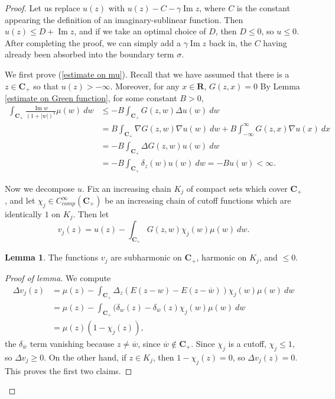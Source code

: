 \documentclass[12pt]{report}
\newcommand{\RR}{\mathbf{R}}
\newcommand{\CC}{\mathbf{C}}
\renewcommand{\Im}{\operatorname{Im}}
\theoremstyle{definition}
\newtheorem{lemma}[theorem]{Lemma}
\begin{document}
\begin{proof}
    Let us replace $u(z)$ with $u(z) - C - \gamma \Im z$, where $C$ is the constant appearing the definition of an imaginary-sublinear function. Then $u(z) \leq D + \Im z$, and if we take an optimal choice of $D$, then $D \leq 0$, so $u \leq 0$. After completing the proof, we can simply add a $\gamma \Im z$ back in, the $C$ having already been absorbed into the boundary term $\sigma$.

    We first prove (\ref{estimate on mu}). Recall that we have assumed that there is a $z \in \CC_+$ so that $u(z) > -\infty$. Moreover, for any $x \in \RR$, $G(z, x) = 0$ By Lemma \ref{estimate on Green function}, for some constant $B > 0$,
\begin{align*}\int_{\CC_+} \frac{\Im w}{(1 + |w|)^2} \mu(w) ~dw &\leq -B\int_{\CC_+} G(z, w) \Delta u(w) ~dw
    \\&= B \int_{\CC_+} \nabla G(z, w) \nabla u(w) ~dw + B\int_{-\infty}^\infty G(z, x) \nabla u(x) ~dx\\
    &= -B \int_{\CC_+} \Delta G(z, w) u(w) ~dw \\&= -B\int_{\CC_+} \delta_z(w) u(w) ~dw = -Bu(w) < \infty.
  \end{align*}

    Now we decompose $u$. Fix an increasing chain $K_j$ of compact sets which cover $\CC_+$, and let $\chi_j \in C^\infty_{comp}(\CC_+)$ be an increasing chain of cutoff functions which are identically $1$ on $K_j$. Then let
    $$v_j(z) = u(z) - \int_{\CC_+} G(z, w) \chi_j(w)\mu(w) ~dw.$$
\begin{lemma}
    The functions $v_j$ are subharmonic on $\CC_+$, harmonic on $K_j$, and $\leq 0$.
\end{lemma}
\begin{proof}[Proof of lemma]
    We compute
\begin{align*}
    \Delta v_j(z) &= \mu(z) - \int_{\CC_+} \Delta_z(E(z - w) - E(z - \overline w)) \chi_j(w) \mu(w) ~dw \\&= \mu(z) - \int_{\CC_+} (\delta_w(z) - \delta_{\overline w}(z) \chi_j(w) \mu(w) ~dw \\&= \mu(z)(1 - \chi_j(z)),
\end{align*}
    the $\delta_{\overline w}$ term vanishing because $z \neq \overline w$, since $\overline w \notin \CC_+$. Since $\chi_j$ is a cutoff, $\chi_j \leq 1$, so $\Delta v_j \geq 0$. On the other hand, if $z \in K_j$, then $1 - \chi_j(z) = 0$, so $\Delta v_j(z) = 0$. This proves the first two claims.


\end{proof}
\end{proof}
\end{document}
